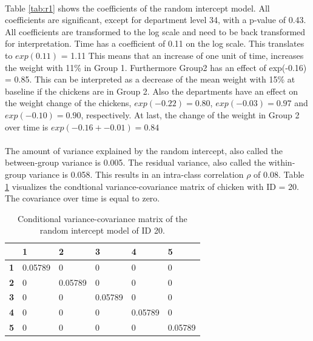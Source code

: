 \documentclass{article}
\begin{document}
\paragraph{}
Table \ref{tab:r1} shows the coefficients of the random intercept model. All coefficients are significant, except for department level 34, with a p-value of 0.43. All coefficients are transformed to the log scale and need to be back transformed for interpretation. Time has a coefficient of 0.11 on the log scale. This translates to $exp(0.11)$ = 1.11 This means that an increase of one unit of time, increases the weight with 11\% in Group 1. Furthermore Group2 has an effect of exp(-0.16) = 0.85. This can be interpreted as a decrease of the mean weight with 15\% at baseline if the chickens are in Group 2. Also the departments have an effect on the weight change of the chickens, $exp(-0.22)=0.80$, $exp(-0.03)=0.97$ and $exp(-0.10)=0.90$, respectively. At last, the change of the weight in Group 2 over time is $exp(-0.16 + -0.01) = 0.84$

\paragraph{}
The amount of variance explained by the random intercept, also called the between-group variance is 0.005. The residual variance, also called the within-group variance is 0.058. This results in an intra-class correlation $\rho$ of 0.08. Table \ref{tab:covar_r1} visualizes the condtional variance-covariance matrix of chicken with ID = 20. The covariance over time is equal to zero.

\begin{table}[h!]
\centering
\caption{Conditional variance-covariance matrix of the random intercept model of ID 20.}
\begin{tabular}{l|lllll}
\hline
           & \textbf{1} & \textbf{2} & \textbf{3} & \textbf{4} & \textbf{5} \\
           \hline
\textbf{1} & 0.05789    & 0          & 0          & 0          & 0           \\
\textbf{2} & 0          & 0.05789    & 0          & 0          & 0          \\
\textbf{3} & 0          & 0          & 0.05789    & 0          & 0          \\
\textbf{4} & 0          & 0          & 0          & 0.05789    & 0          \\
\textbf{5} & 0          & 0          & 0          & 0          & 0.05789  \\
\hline
\end{tabular}
\label{tab:covar_r1}
\end{table}
\end{document}
